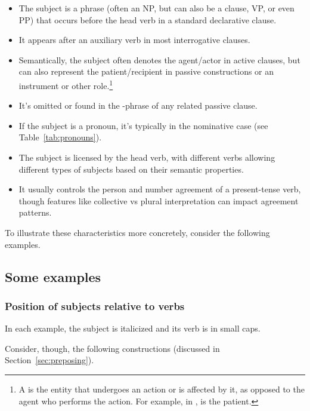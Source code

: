 \begin{itemize}[noitemsep]
    \item The subject is a phrase (often an NP, but can also be a clause, VP, or even PP) that occurs before the head verb in a standard declarative clause.
    \item It appears after an auxiliary verb in most interrogative clauses.
    \item Semantically, the subject often denotes the agent/actor in active clauses, but can also represent the patient/recipient in passive constructions or an instrument or other role.\footnote{A  is the entity that undergoes an action or is affected by it, as opposed to the agent who performs the action. For example, in ,  is the patient.}
    \item It's omitted or found in the -phrase of any related passive clause.
    \item If the subject is a pronoun, it's typically in the nominative case (see Table~\ref{tab:pronouns}).
    \item The subject is licensed by the head verb, with different verbs allowing different types of subjects based on their semantic properties.
    \item It usually controls the person and number agreement of a present-tense verb, though features like collective vs plural interpretation can impact agreement patterns.
\end{itemize}

To illustrate these characteristics more concretely, consider the following examples.

\subsection{Some examples}

\subsubsection*{Position of subjects relative to verbs}
In each example, the subject is italicized and its verb is in small caps. 

\ea
    \z
\z
Consider, though, the following constructions (discussed in Section~\ref{sec:preposing}).

